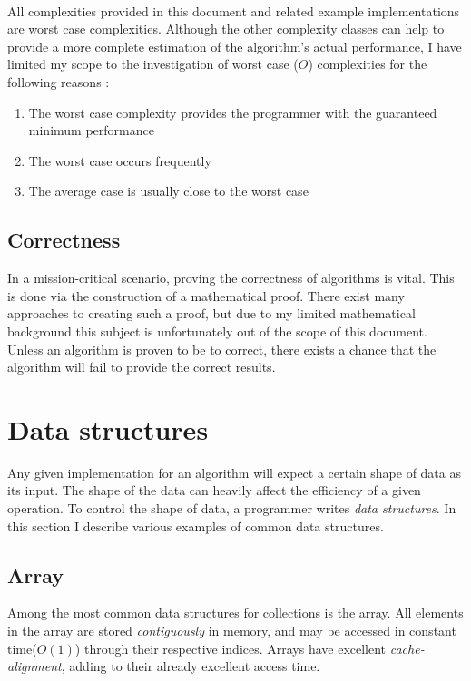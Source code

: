 \documentclass{article}
\begin{document}
\paragraph{}
All complexities provided in this document and related example implementations are worst case complexities. Although the other
complexity classes can help to provide a more complete estimation of the algorithm's actual performance, I have limited my
scope to the investigation of worst case (\(O\)) complexities for the following reasons
 \cite[p.27-28]{introduction-to-algorithms}:
\begin{enumerate}
\item{The worst case complexity provides the programmer with the guaranteed minimum performance}
\item{The worst case occurs frequently}
\item{The average case is usually close to the worst case}
\end{enumerate}

\subsection{Correctness}
In a mission-critical scenario, proving the correctness of algorithms is vital. This is done via the construction of a
mathematical proof. There exist many approaches to creating such a proof, but due to my limited mathematical background
this subject is unfortunately out of the scope of this document. Unless an algorithm is proven to be to correct, there
exists a chance that the algorithm will fail to provide the correct results.


\newpage


\section{Data structures}
Any given implementation for an algorithm will expect a certain shape of data as its input. The shape of the data
can heavily affect the efficiency of a given operation. To control the shape of data, a programmer writes {\em data
structures}. In this section I describe various examples of common data structures.


\subsection{Array}
Among the most common data structures for collections is the array. All elements in the array are stored
{\em contiguously} in memory, and may be accessed in constant time(\(O(1)\)) through their respective indices.
Arrays have excellent {\em cache-alignment}, adding to their already excellent access time.
\end{document}
